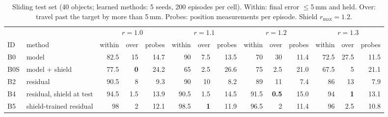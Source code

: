 \begin{table}[t]\centering\footnotesize
\caption{Sliding test set (40 objects; learned methods: 5 seeds, 200 episodes per cell). Within: final error $\le$5\,mm and held. Over: travel past the target by more than 5\,mm. Probes: position measurements per episode. Shield $r_{\max}=1.2$.}\label{tab:slide}
\setlength{\tabcolsep}{3.2pt}
\begin{tabular}{llrrrrrrrrrrrr}
\toprule
 & & \multicolumn{3}{c}{$r=1.0$} & \multicolumn{3}{c}{$r=1.1$} & \multicolumn{3}{c}{$r=1.2$} & \multicolumn{3}{c}{$r=1.3$}\\
\cmidrule(lr){3-5}\cmidrule(lr){6-8}\cmidrule(lr){9-11}\cmidrule(lr){12-14}
ID & method & within & over & probes & within & over & probes & within & over & probes & within & over & probes\\
\midrule
B0 & model & 82.5 & 15 & 14.7 & 90 & 7.5 & 13.5 & 70 & 30 & 11.4 & 72.5 & 27.5 & 11.5\\
B0S & model + shield & 77.5 & \textbf{0} & 24.2 & 65 & 2.5 & 26.6 & 75 & 2.5 & 21.0 & 67.5 & 5 & 21.1\\
\midrule
B2 & residual & 90.5 & 8 & 9.3 & 90 & 10 & 8.2 & 89 & 11 & 7.4 & 86 & 13 & 7.9\\
B4 & residual, shield at test & 94.5 & 1.5 & 13.9 & 90.5 & 1.5 & 14.5 & 91.5 & \textbf{0.5} & 15.0 & 94 & \textbf{1} & 13.1\\
B5 & shield-trained residual & 98 & 2 & 12.1 & 98.5 & \textbf{1} & 11.9 & 96.5 & 2 & 11.4 & 96 & 2.5 & 10.8\\
\bottomrule
\end{tabular}
\end{table}

